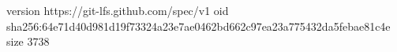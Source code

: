 version https://git-lfs.github.com/spec/v1
oid sha256:64e71d40d981d19f73324a23e7ae0462bd662c97ea23a775432da5febae81c4e
size 3738
